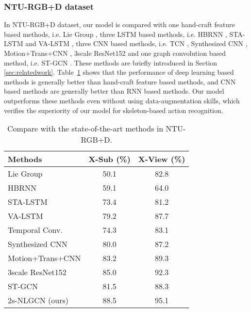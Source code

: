 \documentclass[10pt,twocolumn,letterpaper]{article}
\begin{document}
    \subsubsection{NTU-RGB+D dataset}
    In NTU-RGB+D dataset, our model is compared with one hand-craft feature based methods, i.e. Lie Group \cite{vemulapalli_human_2014}, three LSTM based methods, i.e. HBRNN \cite{du_hierarchical_2015}, STA-LSTM \cite{song_end--end_2017} and VA-LSTM \cite{zhang_view_2017}, three CNN based methods, i.e. TCN \cite{kim_interpretable_2017}, Synthesized CNN \cite{liu_enhanced_2017}, Motion+Trans+CNN \cite{li_skeleton-based_2017}, 3scale ResNet152 \cite{li_skeleton_2017} and one graph convolution based method, i.e. ST-GCN \cite{yan_spatial_2018}. These methods are briefly introduced in Section \ref{sec:relatedwork}. Table~\ref{ntu-rgbd} shows that the performance of deep learning based methods is generally better than hand-craft feature based methods, and CNN based methods are generally better than RNN based methods. Our model outperforms these methods even without using data-augmentation skills, which verifies the superiority of our model for skeleton-based action recognition.
    
      \begin{table}[htb]
      \begin{center}
      \label{ntu-rgbd}
		\begin{tabular}{lcc}
			\hline
			Methods     &X-Sub (\%)& X-View (\%)    \\
            \hline
            Lie Group \cite{vemulapalli_human_2014} & 50.1 & 82.8 \\
			\hline
			HBRNN \cite{du_hierarchical_2015} & 59.1  &    64.0  \\
			STA-LSTM  \cite{song_end--end_2017}  & 73.4 &    81.2  \\
            VA-LSTM  \cite{zhang_view_2017}  & 79.2 &    87.7  \\
            \hline
			Temporal Conv.  \cite{kim_interpretable_2017}   & 74.3&    83.1      \\
            Synthesized CNN \cite{liu_enhanced_2017}   & 80.0 &      87.2  \\
            Motion+Trans+CNN & 83.2  &      89.3  \\
            3scale ResNet152 \cite{li_skeleton_2017}  & 85.0  &      92.3  \\
            \hline
            ST-GCN \cite{yan_spatial_2018} & 81.5  &      88.3  \\
            \hline
            2s-NLGCN (ours)&  88.5 & 95.1 \\
			\hline
		\end{tabular}
      \end{center}
      \caption{Compare with the state-of-the-art methods in NTU-RGB+D.}
	\end{table}
    
\end{document}
